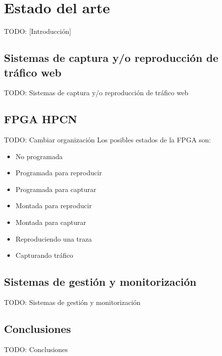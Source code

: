 \chapter{Estado del arte\label{cap:estado_del_arte}}

TODO: [Introducción]


\section{Sistemas de captura y/o reproducción de tráfico web\label{sec:eda:sistemas_captura_reproducccion}}

TODO: Sistemas de captura y/o reproducción de tráfico web

\section{FPGA HPCN\label{ssec:eda:fpga}}
TODO: Cambiar organización
Los posibles estados de la \gls{FPGA} son:
\begin{itemize}\label{fpga:estados}
  \item No programada
  \item Programada para reproducir
  \item Programada para capturar
  \item Montada para reproducir
  \item Montada para capturar
  \item Reproduciendo una \gls{traza}
  \item Capturando tráfico
\end{itemize}

\section{Sistemas de gestión y monitorización\label{sec:eda:sistemas_gestion_monitorizacion}}

TODO: Sistemas de gestión y monitorización


\section{Conclusiones\label{sec:eda:conclusiones}}

TODO: Conclusiones